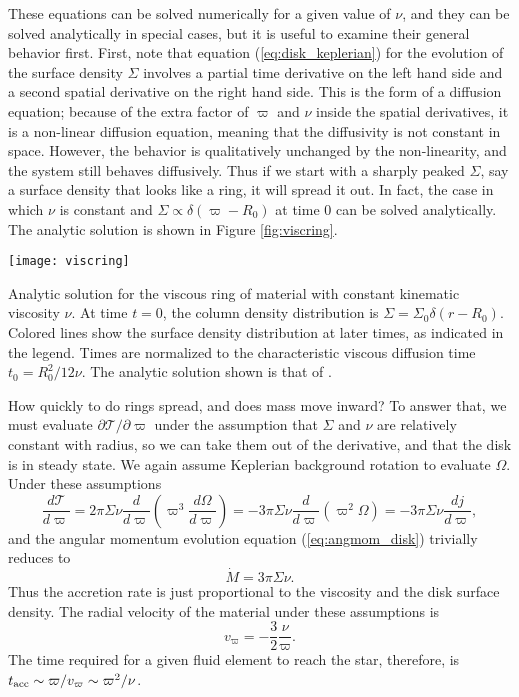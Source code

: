 These equations can be solved numerically for a given value of $\nu$, and they can be solved analytically in special cases, but it is useful to examine their general behavior first. First, note that equation (\ref{eq:disk_keplerian}) for the evolution of the surface density $\Sigma$ involves a partial time derivative on the left hand side and a second spatial derivative on the right hand side. This is the form of a diffusion equation; because of the extra factor of $\varpi$ and $\nu$ inside the spatial derivatives, it is a non-linear diffusion equation, meaning that the diffusivity is not constant in space. However, the behavior is qualitatively unchanged by the non-linearity, and the system still behaves diffusively. Thus if we start with a sharply peaked $\Sigma$, say a surface density that looks like a ring, it will spread it out. In fact, the case in which $\nu$ is constant and $\Sigma\propto \delta(\varpi-R_0)$ at time 0 can be solved analytically. The analytic solution is shown in Figure \ref{fig:viscring}.

\begin{marginfigure}
\texttt{[image: viscring]}
\caption[Viscous ring evolution]{
\label{fig:viscring}
Analytic solution for the viscous ring of material with constant kinematic viscosity $\nu$. At time $t=0$, the column density distribution is $\Sigma = \Sigma_0 \delta(r-R_0)$. Colored lines show the surface density distribution at later times, as indicated in the legend. Times are normalized to the characteristic viscous diffusion time $t_0 = R_0^2/12\nu$. The analytic solution shown is that of \citet{pringle81a}.
}
\end{marginfigure}


How quickly to do rings spread, and does mass move inward? To answer that, we must evaluate $\partial \mathcal{T}/\partial \varpi$ under the assumption that $\Sigma$ and $\nu$ are relatively constant with radius, so we can take them out of the derivative, and that the disk is in steady state. We again assume Keplerian background rotation to evaluate $\Omega$. Under these assumptions
\begin{equation}
\frac{d\mathcal{T}}{d\varpi} = 2\pi \Sigma \nu \frac{d}{d\varpi}\left(\varpi^3 \frac{d\Omega}{d\varpi}\right) = -3\pi\Sigma \nu \frac{d}{d\varpi}(\varpi^2\Omega) = -3\pi \Sigma \nu \frac{dj}{d\varpi},
\end{equation}
and the angular momentum evolution equation (\ref{eq:angmom_disk}) trivially reduces to
\begin{equation}
\dot{M} = 3\pi\Sigma\nu.
\end{equation}
Thus the accretion rate is just proportional to the viscosity and the disk surface density. The radial velocity of the material under these assumptions is
\begin{equation}
v_\varpi = -\frac{3}{2} \frac{\nu}{\varpi}.
\end{equation}
The time required for a given fluid element to reach the star, therefore, is $t_{\rm acc}\sim \varpi/v_\varpi \sim \varpi^2/\nu$.

